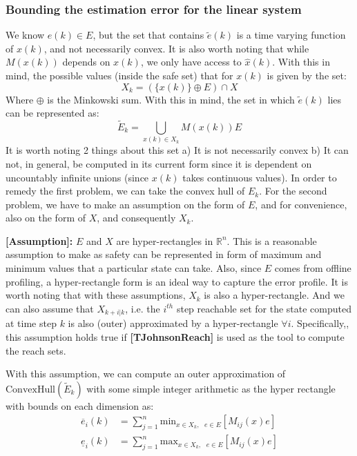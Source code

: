 \documentclass{article}[14pt]
\begin{document}
\subsubsection{Bounding the estimation error for the linear system}

We know $e(k)\in E$, but the set that contains $\tilde{e}(k)$ is a time varying function of $x(k)$, and not necessarily convex. It is also worth noting that while $M(x(k))$ depends on $x(k)$, we only have access to $\hat{x}(k)$. With this in mind, the possible values (inside the safe set) that for $x(k)$ is given by the set:
\begin{equation}
X_k = (\{x(k)\}\oplus E)\cap X
\end{equation}
Where $\oplus$ is the Minkowski sum. With this in mind, the set in which $\tilde{e}(k)$ lies can be represented as:
\begin{equation}
\tilde{E}_k = \bigcup\limits_{x(k)\in X_k} M(x(k))E
\end{equation}
It is worth noting 2 things about this set a) It is not necessarily convex b) It can not, in general, be computed in its current form since it is dependent on uncountably infinite unions (since $x(k)$ takes continuous values). In order to remedy the first problem, we can take the convex hull of ${E}_k$. For the second problem, we have to make an assumption on the form of $E$, and for convenience, also on the form of $X$, and consequently $X_k$.

\textbf{[Assumption]:} $E$ and $X$ are hyper-rectangles in $\mathbb{R}^n$. This is a reasonable assumption to make as safety can be represented in form of maximum and minimum values that a particular state can take. Also, since $E$ comes from offline profiling, a hyper-rectangle form is an ideal way to capture the error profile. It is worth noting that with these assumptions, $X_k$ is also a hyper-rectangle. And we can also assume that $X_{k+i|k}$, i.e. the $i^{th}$ step reachable set for the state computed at time step $k$ is also (outer) approximated by a hyper-rectangle $\forall i$. Specifically,, this assumption holds true if \textbf{[TJohnsonReach]} is used as the tool to compute the reach sets.

With this assumption, we can compute an outer approximation of $\text{ConvexHull}(\tilde{E}_k)$ with some simple integer arithmetic as the hyper rectangle with bounds on each dimension as:
\begin{subequations}
\label{eq:outer_error}
\begin{align}
\overline{{e}}_i(k)&= \sum_{j=1}^n \text{min}_{x\in X_k,\text{ }e\in E } [M_{ij}(x)e] \\
\underline{{e}}_i(k)&= \sum_{j=1}^n \text{max}_{x\in X_k,\text{ }e\in E } [M_{ij}(x)e] 
\end{align}
\end{subequations}
\end{document}
